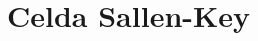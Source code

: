 \documentclass[../../tc_tp5_main.tex]{subfiles}
\begin{document}
\chapter{Celda Sallen-Key}


\clearpage\newpage
\end{document}
